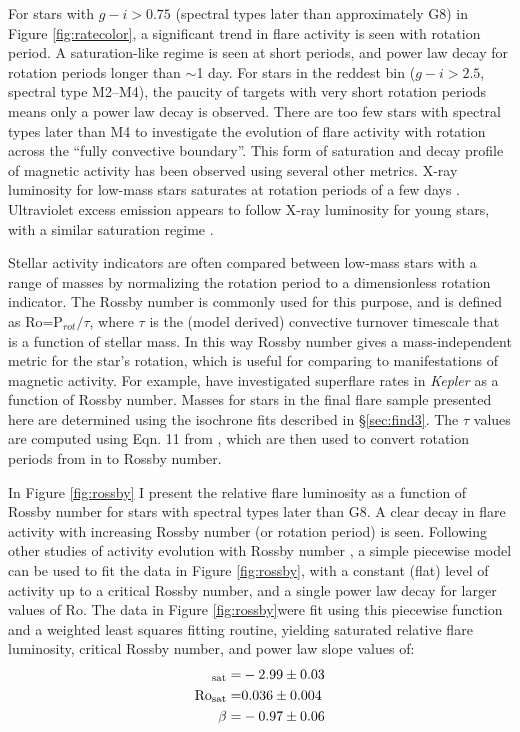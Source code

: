 \documentclass[twocolumn]{aastex6}
\newcommand{\Kepler}{\textsl{Kepler}\xspace}
\begin{document}
For stars with $g-i>0.75$ (spectral types later than approximately G8) in Figure \ref{fig:ratecolor}, a significant trend in flare activity is seen with rotation period. A saturation-like regime is seen at short periods, and power law decay for rotation periods longer than $\sim$1 day. For stars in the reddest bin ($g-i>2.5$, spectral type M2--M4), the paucity of targets with very short rotation periods means only a power law decay is observed. There are too few stars with spectral types later than M4 to investigate the evolution of flare activity with rotation across the ``fully convective boundary''. This form of saturation and decay profile of magnetic activity has been observed using several other metrics. X-ray luminosity for low-mass stars  saturates at rotation periods of a few days \citep{pizzolato2003,wright2011}. Ultraviolet excess emission appears to follow X-ray luminosity for young stars, with a similar saturation regime \citep{shkolnik2014}.




Stellar activity indicators are often compared between low-mass stars with a range of masses by normalizing the rotation period to a dimensionless rotation indicator. The Rossby number is commonly used for this purpose, and is defined as Ro=P$_{rot}/\tau$, where $\tau$ is the (model derived) convective turnover timescale that is a function of stellar mass.  In this way Rossby number gives a mass-independent metric for the star's rotation, which is useful for comparing to manifestations of magnetic activity. For example, \citet{candelaresi2014} have investigated superflare rates in \Kepler as a function of Rossby number. Masses for stars in the final flare sample presented here are determined using the isochrone fits described in \S\ref{sec:find3}. The $\tau$ values are computed using Eqn. 11 from \citet{wright2011}, which are then used to convert rotation periods from \citet{mcquillan2014} in to Rossby number.




In Figure \ref{fig:rossby} I present the relative flare luminosity as a function of Rossby number for stars with spectral types later than G8. A clear decay in flare activity with increasing Rossby number (or rotation period) is seen. Following other studies of activity evolution with Rossby number \citet[e.g.][]{wright2011}, a simple piecewise model can be used to fit the data in Figure \ref{fig:rossby}, with a constant (flat) level of activity up to a critical Rossby number, and a single power law decay for larger values of Ro. The data in Figure \ref{fig:rossby}were fit using this piecewise function and a weighted least squares fitting routine, yielding saturated relative flare luminosity, critical Rossby number, and power law slope values of:
\begin{eqnarray}
[\log (L_{fl} L_{Kp}^{-1})]_{\rm sat} =& -2.99 \pm 0.03 \notag \\
\rm{Ro_{sat}} =& 0.036 \pm 0.004 \notag \\
\beta = & -0.97 \pm 0.06 
\end{eqnarray}
\end{document}
